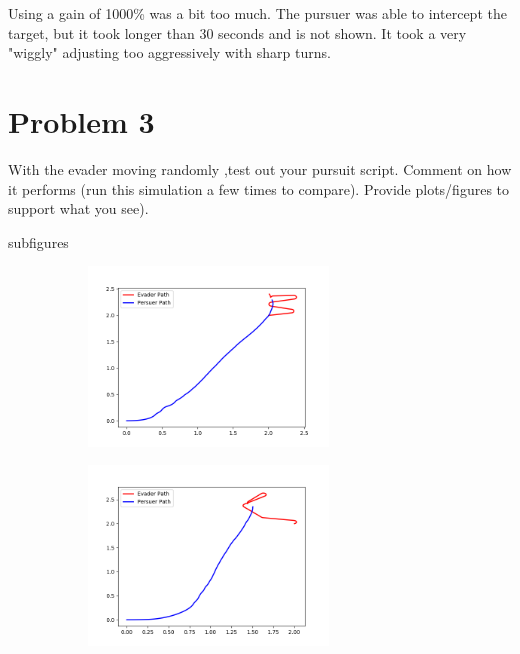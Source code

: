 \documentclass{article}
\begin{document}
\bigskip
\noindent Using a gain of 1000\% was a bit too much. The pursuer was able to intercept the target, but it took longer than 30 seconds and is not shown. It took a very "wiggly" adjusting too aggressively with sharp turns.

\section*{Problem 3}

With the evader moving randomly ,test out your pursuit script. Comment on how it performs (run 
this simulation a few times to compare). Provide plots/figures to support what you see).

subfigures 

\bigskip
\begin{figure}[H]
    \begin{subfigure}[b]{0.5\textwidth}
        \centering
        \includegraphics[width=0.7\textwidth]{images/question3a.png}
        \label{fig:question3a}
    \end{subfigure}
    \begin{subfigure}[b]{0.5\textwidth}
        \centering
        \includegraphics[width=0.7\textwidth]{images/question3b.png}

\end{subfigure}
\end{figure}
\end{document}
